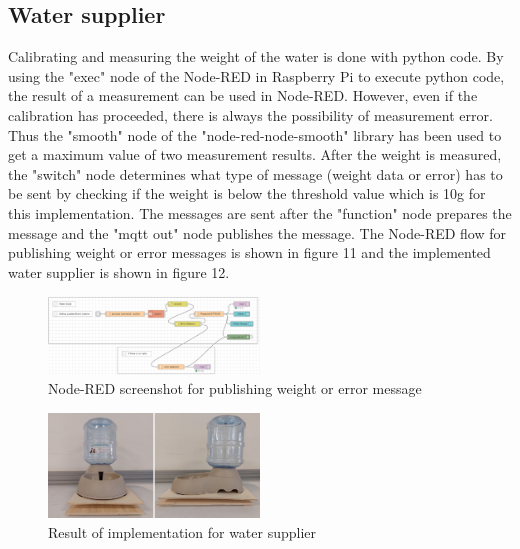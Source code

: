 \documentclass[conference]{IEEEtran}
\begin{document}
\subsection{Water supplier}
Calibrating and measuring the weight of the water is done with python code.
By using the "exec" node of the Node-RED in Raspberry Pi to execute python code, the result of a measurement can be used in Node-RED.
However, even if the calibration has proceeded, there is always the possibility of measurement error.
Thus the "smooth" node of the "node-red-node-smooth" library has been used to get a maximum value of two measurement results.
After the weight is measured, the "switch" node determines what type of message (weight data or error) has to be sent by checking if the weight is below the threshold value which is 10g for this implementation.
The messages are sent after the "function" node prepares the message and the "mqtt out" node publishes the message.
The Node-RED flow for publishing weight or error messages is shown in figure 11 and the implemented water supplier is shown in figure 12.

\begin{figure}[htbp]
\centerline{\includegraphics[width=0.5\textwidth]{./images/Water Supplier Error Detection.png}}
\caption{Node-RED screenshot for publishing weight or error message}
\label{fig}
\end{figure}

\begin{figure}[htbp]
\centerline{\includegraphics[width=0.5\textwidth]{./images/water-supplier.jpg}}
\caption{Result of implementation for water supplier}
\label{fig}
\end{figure}
\end{document}
